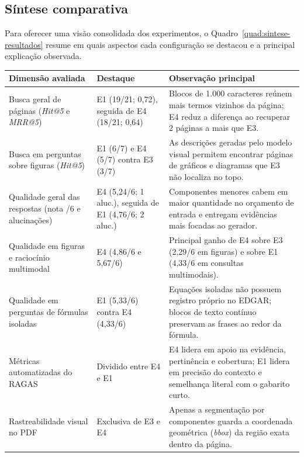 \subsection{Síntese comparativa}
\label{sec:sintese-comparativa}

Para oferecer uma visão consolidada dos experimentos, o Quadro~\ref{quad:sintese-resultados} resume em quais aspectos cada configuração se destacou e a principal explicação observada.

\begin{quadro}[H]
\centering
\caption{Síntese dos resultados comparativos entre as quatro configurações.}
\label{quad:sintese-resultados}
\begingroup
\small
\renewcommand{\arraystretch}{1.2}
\begin{tabularx}{\textwidth}{|p{3.6cm}|p{3.2cm}|X|}
\hline
\textbf{Dimensão avaliada} & \textbf{Destaque} & \textbf{Observação principal} \\
\hline
Busca geral de páginas (\textit{Hit@5} e \textit{MRR@5}) & E1 (19/21; 0,72), seguida de E4 (18/21; 0,64) & Blocos de 1.000 caracteres reúnem mais termos vizinhos da página; E4 reduz a diferença ao recuperar 2 páginas a mais que E3. \\
\hline
Busca em perguntas sobre figuras (\textit{Hit@5}) & E1 (6/7) e E4 (5/7) contra E3 (3/7) & As descrições geradas pelo modelo visual permitem encontrar páginas de gráficos e diagramas que E3 não localiza no topo. \\
\hline
Qualidade geral das respostas (nota /6 e alucinações) & E4 (5,24/6; 1 aluc.), seguida de E1 (4,76/6; 2 aluc.) & Componentes menores cabem em maior quantidade no orçamento de entrada e entregam evidências mais focadas ao gerador. \\
\hline
Qualidade em figuras e raciocínio multimodal & E4 (4,86/6 e 5,67/6) & Principal ganho de E4 sobre E3 (2,29/6 em figuras) e sobre E1 (4,33/6 em consultas multimodais). \\
\hline
Qualidade em perguntas de fórmulas isoladas & E1 (5,33/6) contra E4 (4,33/6) & Equações isoladas não possuem registro próprio no EDGAR; blocos de texto contínuo preservam as frases ao redor da fórmula. \\
\hline
Métricas automatizadas do RAGAS & Dividido entre E4 e E1 & E4 lidera em apoio na evidência, pertinência e cobertura; E1 lidera em precisão do contexto e semelhança literal com o gabarito curto. \\
\hline
Rastreabilidade visual no PDF & Exclusiva de E3 e E4 & Apenas a segmentação por componentes guarda a coordenada geométrica (\textit{bbox}) da região exata dentro da página. \\
\hline
\end{tabularx}
\endgroup
{}
\end{quadro}

